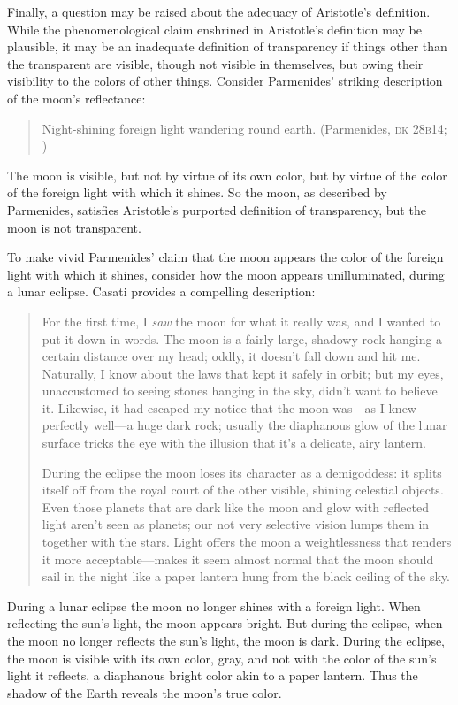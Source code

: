 Finally, a question may be raised about the adequacy of Aristotle's definition. While the phenomenological claim enshrined in Aristotle's definition may be plausible, it may be an inadequate definition of transparency if things other than the transparent are visible, though not visible in themselves, but owing their visibility to the colors of other things. Consider Parmenides' striking description of the moon's reflectance:
\begin{quote}
	Night-shining foreign light wandering round earth. (Parmenides, \textsc{dk} 28\textsc{b}14; \citealt[156]{McKirahan:1994ve})
\end{quote}
The moon is visible, but not by virtue of its own color, but by virtue of the color of the foreign light with which it shines. So the moon, as described by Parmenides, satisfies Aristotle's purported definition of transparency, but the moon is not transparent. 

To make vivid Parmenides' claim that the moon appears the color of the foreign light with which it shines, consider how the moon appears unilluminated, during a lunar eclipse. Casati provides a compelling description:
\begin{quotation}
	\noindent For the first time, I \emph{saw} the moon for what it really was, and I wanted to put it down in words. The moon is a fairly large, shadowy rock hanging a certain distance over my head; oddly, it doesn't fall down and hit me. Naturally, I know about the laws that kept it safely in orbit; but my eyes, unaccustomed to seeing stones hanging in the sky, didn't want to believe it. Likewise, it had escaped my notice that the moon was---as I knew perfectly well---a huge dark rock; usually the diaphanous glow of the lunar surface tricks the eye with the illusion that it's a delicate, airy lantern.
	
	During the eclipse the moon loses its character as a demigoddess: it splits itself off from the royal court of the other visible, shining celestial objects. Even those planets that are dark like the moon and glow with reflected light aren't seen as planets; our not very selective vision lumps them in together with the stars. Light offers the moon a weightlessness that renders it more acceptable---makes it seem almost normal that the moon should sail in the night like a paper lantern hung from the black ceiling of the sky. \citep[3--4]{Casati:2003aa}
\end{quotation}
During a lunar eclipse the moon no longer shines with a foreign light. When reflecting the sun's light, the moon appears bright. But during the eclipse, when the moon no longer reflects the sun's light, the moon is dark. During the eclipse, the moon is visible with its own color, gray, and not with the color of the sun's light it reflects, a diaphanous bright color akin to a paper lantern. Thus the shadow of the Earth reveals the moon's true color.

